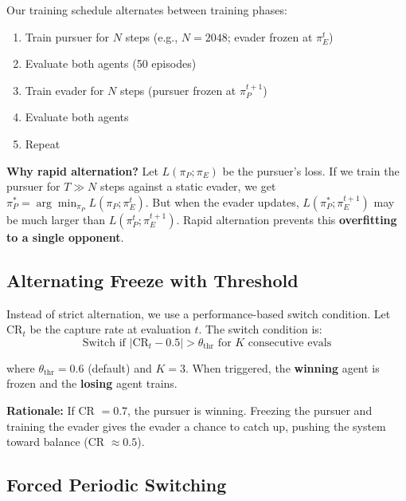 \documentclass[11pt,a4paper]{report}
\begin{document}
Our training schedule alternates between training phases:
\begin{enumerate}
    \item Train pursuer for $N$ steps (e.g., $N = 2048$; evader frozen at $\pi_E^t$)
    \item Evaluate both agents (50 episodes)
    \item Train evader for $N$ steps (pursuer frozen at $\pi_P^{t+1}$)
    \item Evaluate both agents
    \item Repeat
\end{enumerate}

\textbf{Why rapid alternation?} Let $L(\pi_P; \pi_E)$ be the pursuer's loss. If we train the pursuer for $T \gg N$ steps against a static evader, we get $\pi_P^* = \arg\min_{\pi_P} L(\pi_P; \pi_E^t)$. But when the evader updates, $L(\pi_P^*; \pi_E^{t+1})$ may be much larger than $L(\pi_P^t; \pi_E^{t+1})$. Rapid alternation prevents this \textbf{overfitting to a single opponent}.

\subsection{Alternating Freeze with Threshold}

Instead of strict alternation, we use a performance-based switch condition. Let $\text{CR}_t$ be the capture rate at evaluation $t$. The switch condition is:
\begin{equation}
    \text{Switch if } |\text{CR}_t - 0.5| > \theta_{\text{thr}} \text{ for } K \text{ consecutive evals}
\end{equation}

where $\theta_{\text{thr}} = 0.6$ (default) and $K = 3$. When triggered, the \textbf{winning} agent is frozen and the \textbf{losing} agent trains.

\textbf{Rationale:} If CR $= 0.7$, the pursuer is winning. Freezing the pursuer and training the evader gives the evader a chance to catch up, pushing the system toward balance (CR $\approx 0.5$).

\subsection{Forced Periodic Switching}
\end{document}
